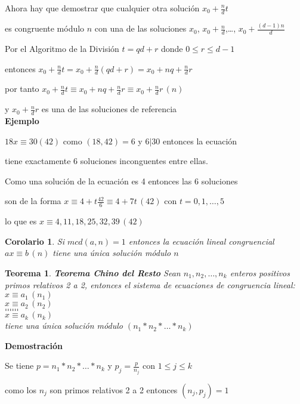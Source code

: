 \documentclass[a4paper,12pt]{report}
\newtheorem*{teo}{Teorema}
\newtheorem*{cor}{Corolario}
\begin{document}
Ahora hay que demostrar que cualquier otra solución $x_0 + \frac{n}{d}t$ 

es congruente módulo $n$ con una de las soluciones $x_0$, $x_0 + \frac{n}{d}$,\dots, $x_0 + \frac{(d-1)n}{d}$

Por el Algoritmo de la División  $t=qd+r$ donde $0 \leq r \leq d-1$

entonces $x_0 + \frac{n}{d}t = x_0 + \frac{n}{d}(qd+r) =  x_0 + nq + \frac{n}{d}r$

por tanto $x_0 + \frac{n}{d}t \equiv x_0 + nq + \frac{n}{d}r \equiv x_0 + \frac{n}{d}r \, (n)$

y $x_0 + \frac{n}{d}r$ es una de las soluciones de referencia\\

\textbf{Ejemplo}

$18x\equiv 30 (42)$ como $(18,42)=6$ y $6|30$ entonces la ecuación 

tiene exactamente 6 soluciones inconguentes entre ellas.

Como una solución de la ecuación es 4 entonces las 6 soluciones 

son  de la forma $x\equiv 4 + t\frac{42}{6} \equiv 4 +7t \, (42)$ con $t=0,1,\dots,5$

lo que es $x\equiv 4, 11, 18, 25, 32, 39 \, (42)$



\begin{cor}
 Si $mcd(a,n)=1$ entonces la ecuación lineal congruencial $ax\equiv b \, (n)$ tiene una única solución módulo $n$
\end{cor}

\begin{teo}
 \textbf{Teorema Chino del Resto} Sean $n_1,n_2,\dots,n_k$ enteros positivos primos relativos 2 a 2, entonces el sistema de ecuaciones de congruencia lineal:\\
 $x\equiv a_1 \, (n_1)$\\
 $x\equiv a_2 \, (n_2)$\\
 $\dots\dots$\\
 $\dots\dots$\\
 $x\equiv a_k \, (n_k)$\\
 tiene una única solución módulo $(n_1 * n_2 * \dots *n_k)$
\end{teo}

\textbf{Demostración}

Se tiene $p=n_1*n_2*\dots *n_k$ y $p_j=\frac{p}{n_j}$ con $1\leq j \leq k$

como los $n_j$ son primos relativos 2 a 2 entonces $(n_j,p_j)=1$
\end{document}
